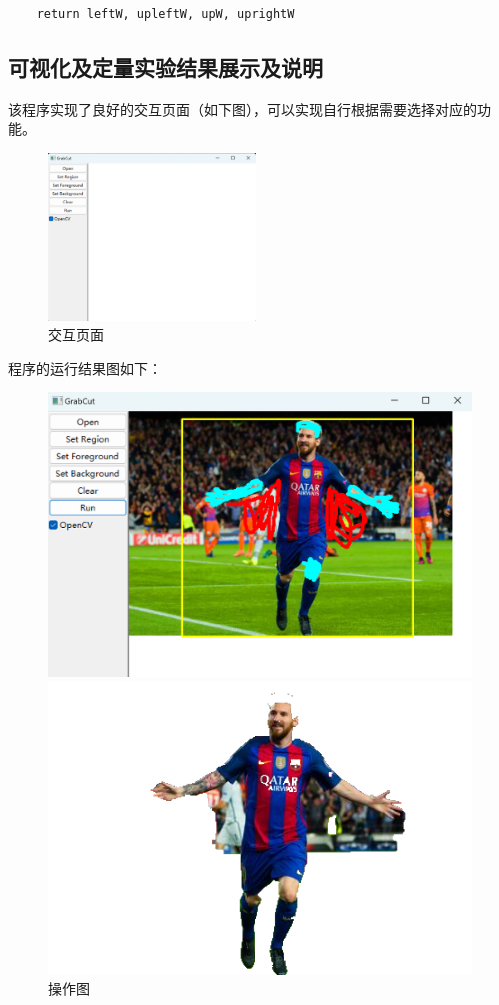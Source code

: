 \documentclass[12pt,a4paper]{article}
\begin{document}
\begin{CJK}{UTF8}{gbsn}
\begin{sloppypar}
\begin{lstlisting}
    return leftW, upleftW, upW, uprightW
\end{lstlisting}

\subsection{可视化及定量实验结果展示及说明}
该程序实现了良好的交互页面（如下图），可以实现自行根据需要选择对应的功能。
\begin{figure}[H]
    \centering
    \includegraphics[width=0.49\textwidth]{Initial_page.png}
    \caption{交互页面}
\end{figure}
程序的运行结果图如下：\\
\begin{figure}[H]
	\centering
	\begin{minipage}{0.49\linewidth}
		\centering
		\includegraphics[width=0.9\linewidth]{P1.png}
		\caption{操作图}
		\label{g1}%
	\end{minipage}
	\begin{minipage}{0.49\linewidth}
		\centering
		\includegraphics[width=0.9\linewidth]{P1_2.png}

\end{minipage}
\end{figure}
\end{sloppypar}
\end{CJK}
\end{document}
